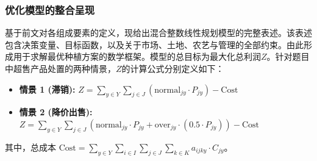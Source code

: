 \subsubsection{优化模型的整合呈现}

基于前文对各组成要素的定义，现给出混合整数线性规划模型的完整表述。该表述包含决策变量、目标函数，以及关于市场、土地、农艺与管理的全部约束。由此形成用于求解最优种植方案的数学框架。模型的总目标为最大化总利润$Z$。针对题目中超售产品处置的两种情景，$Z$的计算公式分别定义如下：
\begin{itemize}
    \item \textbf{情景 1 (滞销):} $Z = \sum_{y \in Y} \sum_{j \in J} (\text{normal}_{jy} \cdot P_{jy}) - \text{Cost}$
    \item \textbf{情景 2 (降价出售):} $Z = \sum_{y \in Y} \sum_{j \in J} (\text{normal}_{jy} \cdot P_{jy} + \text{over}_{jy} \cdot (0.5 \cdot P_{jy})) - \text{Cost}$
\end{itemize}
其中，总成本 $\text{Cost} = \sum_{y \in Y} \sum_{i \in I} \sum_{j \in J} \sum_{k \in K} a_{ijky} \cdot C_{jy}$。

